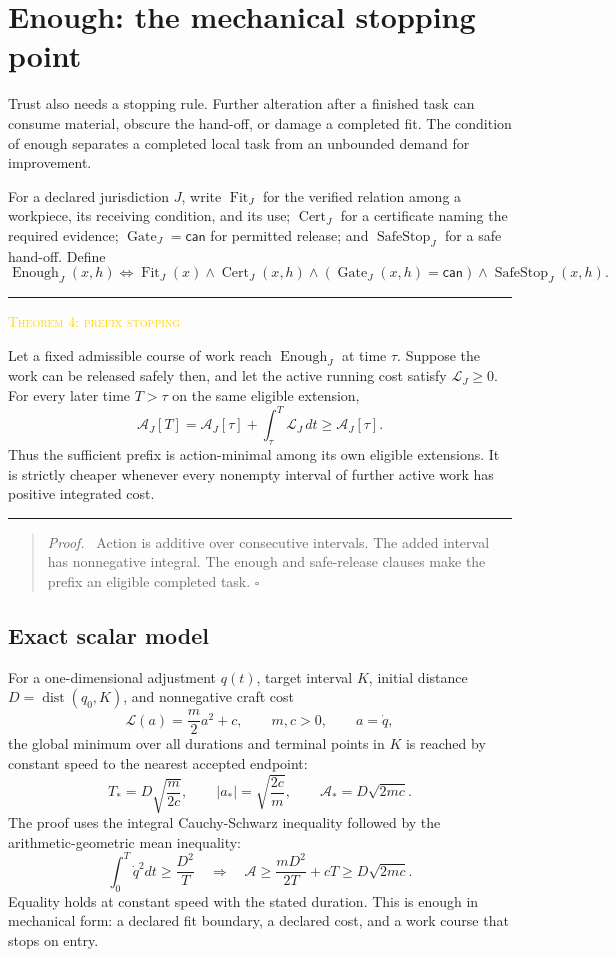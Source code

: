 \documentclass[11pt]{article}
\newcommand{\smallcaps}[1]{{\footnotesize\textsc{#1}}}
\newenvironment{claimbox}[1]{%
  \par\vspace{0.55em}\noindent\begin{minipage}{\linewidth}
  \color{line}\rule{\linewidth}{0.55pt}\par\vspace{0.34em}%
  \textcolor{gold}{\smallcaps{#1}}\par\vspace{0.3em}\color{ink}%
}{%
  \par\vspace{0.38em}\color{line}\rule{\linewidth}{0.55pt}%
  \end{minipage}\par\vspace{0.55em}%
}
\newenvironment{proofbox}{%
  \begin{quote}\small\color{deep}\textit{Proof.}\ }{\hfill$\square$\end{quote}}
\begin{document}
\section{Enough: the mechanical stopping point}

Trust also needs a stopping rule. Further alteration after a finished task can consume material, obscure the hand-off, or damage a completed fit. The condition of enough separates a completed local task from an unbounded demand for improvement.

For a declared jurisdiction $J$, write $\operatorname{Fit}_J$ for the verified relation among a workpiece, its receiving condition, and its use; $\operatorname{Cert}_J$ for a certificate naming the required evidence; $\operatorname{Gate}_J=\mathsf{can}$ for permitted release; and $\operatorname{SafeStop}_J$ for a safe hand-off. Define
\[
\operatorname{Enough}_J(x,h)
\Longleftrightarrow
\operatorname{Fit}_J(x)\land
\operatorname{Cert}_J(x,h)\land
(\operatorname{Gate}_J(x,h)=\mathsf{can})\land
\operatorname{SafeStop}_J(x,h).
\tag{13}\label{eq:enough}
\]

\begin{claimbox}{Theorem 4: prefix stopping}
Let a fixed admissible course of work reach $\operatorname{Enough}_J$ at time $\tau$. Suppose the work can be released safely then, and let the active running cost satisfy $\mathcal L_J\ge0$. For every later time $T>\tau$ on the same eligible extension,
\[
\mathcal A_J[T]=\mathcal A_J[\tau]+\int_\tau^T\mathcal L_J\,dt
\ge \mathcal A_J[\tau].
\tag{14}\label{eq:prefix}
\]
Thus the sufficient prefix is action-minimal among its own eligible extensions. It is strictly cheaper whenever every nonempty interval of further active work has positive integrated cost.
\end{claimbox}

\begin{proofbox}
Action is additive over consecutive intervals. The added interval has nonnegative integral. The enough and safe-release clauses make the prefix an eligible completed task.
\end{proofbox}

\subsection{Exact scalar model}

For a one-dimensional adjustment $q(t)$, target interval $K$, initial distance $D=\operatorname{dist}(q_0,K)$, and nonnegative craft cost
\[
\mathcal L(a)=\frac{m}{2}a^2+c,\qquad m,c>0,\qquad a=\dot q,
\tag{15}\label{eq:scalarcost}
\]
the global minimum over all durations and terminal points in $K$ is reached by constant speed to the nearest accepted endpoint:
\[
T_*=D\sqrt{\frac{m}{2c}},\qquad
|a_*|=\sqrt{\frac{2c}{m}},\qquad
\mathcal A_*=D\sqrt{2mc}.
\tag{16}\label{eq:scalar}
\]
The proof uses the integral Cauchy-Schwarz inequality followed by the arithmetic-geometric mean inequality:
\[
\int_0^T\dot q^2dt\ge\frac{D^2}{T}
\quad\Longrightarrow\quad
\mathcal A\ge\frac{mD^2}{2T}+cT\ge D\sqrt{2mc}.
\tag{17}\label{eq:scalarproof}
\]
Equality holds at constant speed with the stated duration. This is enough in mechanical form: a declared fit boundary, a declared cost, and a work course that stops on entry.
\end{document}
